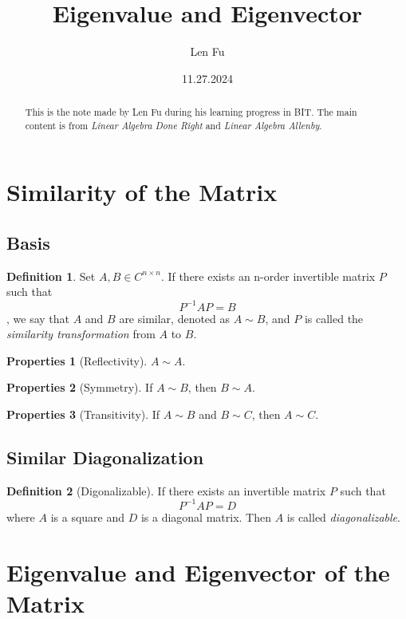 \documentclass{article}
\title{Eigenvalue and Eigenvector}
\author{Len Fu}
\date{11.27.2024}
\theoremstyle{definition}
\newtheorem{defi}{Definition}[section]
\newtheorem{pro}{Properties}[section]
\begin{document}
\maketitle

\begin{abstract}
    This is the note made by Len Fu during his learning progress in BIT.
    The main content is from \textit{Linear Algebra Done Right} and \textit{Linear Algebra Allenby}.
\end{abstract}

\tableofcontents

\newpage

\section{Similarity of the Matrix}
\subsection{Basis}
\begin{defi}
    Set $A,B\in C^{n\times n}$. If there exists
    an n-order invertible matrix $P$ such that 
    $$P^{-1}AP=B$$, we say that $A$ and $B$ are similar,
    denoted as $A\sim B$, and $P$ is called the 
    \textit{similarity transformation} from $A$ to $B$. 
\end{defi}

\begin{pro}[Reflectivity]
    $A\sim A$.
\end{pro}

\begin{pro}[Symmetry]
    If $A\sim B$, then $B\sim A$.
\end{pro}

\begin{pro}[Transitivity]
    If $A\sim B$ and $B\sim C$, then $A\sim C$.
\end{pro}

\subsection{Similar Diagonalization}
\begin{defi}[Digonalizable]
    If there exists an invertible matrix $P$ such that
    $$P^{-1}AP=D$$
    where $A$ is a square and $D$ is a diagonal matrix.
    Then $A$ is called \textit{diagonalizable}.
\end{defi}


\section{Eigenvalue and Eigenvector of the Matrix}
\end{document}
